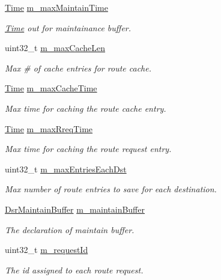 \begin{DoxyCompactItemize}
\hyperlink{classns3_1_1Time}{Time} \hyperlink{classns3_1_1dsr_1_1DsrRouting_ac6b1dffa9665af0d6a71aa7b947962ee}{m\+\_\+max\+Maintain\+Time}
\begin{DoxyCompactList}\small\item\em \hyperlink{classns3_1_1Time}{Time} out for maintainance buffer. \end{DoxyCompactList}\item 
uint32\+\_\+t \hyperlink{classns3_1_1dsr_1_1DsrRouting_afce2c0909aecc7dfe4528f7f6b042019}{m\+\_\+max\+Cache\+Len}
\begin{DoxyCompactList}\small\item\em Max \# of cache entries for route cache. \end{DoxyCompactList}\item 
\hyperlink{classns3_1_1Time}{Time} \hyperlink{classns3_1_1dsr_1_1DsrRouting_a76d8abfedbda7429e983c407748400be}{m\+\_\+max\+Cache\+Time}
\begin{DoxyCompactList}\small\item\em Max time for caching the route cache entry. \end{DoxyCompactList}\item 
\hyperlink{classns3_1_1Time}{Time} \hyperlink{classns3_1_1dsr_1_1DsrRouting_a8f44b1800a0eff487b8490c65cee2d0a}{m\+\_\+max\+Rreq\+Time}
\begin{DoxyCompactList}\small\item\em Max time for caching the route request entry. \end{DoxyCompactList}\item 
uint32\+\_\+t \hyperlink{classns3_1_1dsr_1_1DsrRouting_a470ec4bd470cd1d802621752331d9916}{m\+\_\+max\+Entries\+Each\+Dst}
\begin{DoxyCompactList}\small\item\em Max number of route entries to save for each destination. \end{DoxyCompactList}\item 
\hyperlink{classns3_1_1dsr_1_1DsrMaintainBuffer}{Dsr\+Maintain\+Buffer} \hyperlink{classns3_1_1dsr_1_1DsrRouting_ac9d28a64437fbe20a4228c9811f9fc27}{m\+\_\+maintain\+Buffer}
\begin{DoxyCompactList}\small\item\em The declaration of maintain buffer. \end{DoxyCompactList}\item 
uint32\+\_\+t \hyperlink{classns3_1_1dsr_1_1DsrRouting_a4d9ddfed8e907a5885bb5e0f4b41f388}{m\+\_\+request\+Id}
\begin{DoxyCompactList}\small\item\em The id assigned to each route request. \end{DoxyCompactList}\item 

\end{DoxyCompactItemize}
